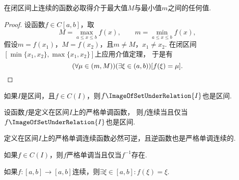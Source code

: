 \begin{corollary}\label{theorem:极限.闭区间上连续函数的性质.介值定理2}
在闭区间上连续的函数必取得介于最大值\(M\)与最小值\(m\)之间的任何值.
\begin{proof}
设函数\(f \in C[a,b]\)，取\[
	M=\max_{a \leq x \leq b} f(x), \qquad
	m=\min_{a \leq x \leq b} f(x),
\]
假设\(m=f(x_1)\)，\(M=f(x_2)\)，且\(m \neq M\)，\(x_1 \neq x_2\).
在闭区间\([\min\{x_1,x_2\},\max\{x_1,x_2\}]\)上应用介值定理，
于是有\[
	(\forall\mu\in(m,M))(\exists\xi\in(a,b))
	[f(\xi)=\mu].
	\qedhere
\]
\end{proof}
\end{corollary}

\begin{corollary}
如果\(I\)是区间，且\(f\in C(I)\)，则\(f\ImageOfSetUnderRelation{I}\)也是区间.
\end{corollary}

\begin{corollary}
设函数\(f\)是定义在区间\(I\)上的严格单调函数，
则\(f\)连续当且仅当\(f\ImageOfSetUnderRelation{I}\)也是区间.
\end{corollary}

\begin{corollary}
定义在区间\(I\)上的严格单调连续函数必然可逆，且逆函数也是严格单调连续的.
\end{corollary}

\begin{corollary}
如果\(f \in C(I)\)，则\(f\)严格单调当且仅当\(f^{-1}\)存在.
\end{corollary}

\begin{corollary}
如果\(f\colon[a,b]\to[a,b]\)连续，则\(\exists\xi\in[a,b]: f(\xi)=\xi\).
\end{corollary}

